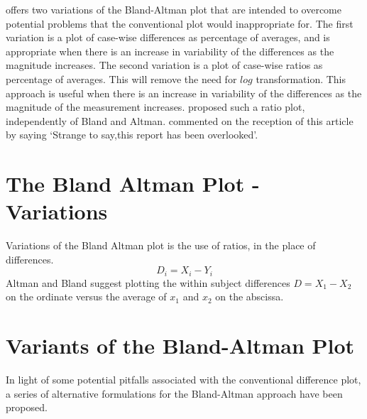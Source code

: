 \documentclass[12pt, a4paper]{report}
\theoremstyle{plain}
\theoremstyle{definition}
\theoremstyle{remark}
\begin{document}
	\citet{BA99} offers two variations of the Bland-Altman plot that
	are intended to overcome potential problems that the conventional
	plot would inappropriate for. The first variation is a plot of
	case-wise differences as percentage of averages, and is
	appropriate when there is an increase in variability of the
	differences as the magnitude increases. The second variation is a
	plot of case-wise ratios as percentage of averages. This will
	remove the need for $log$ transformation. This approach is useful
	when there is an increase in variability of the differences as the
	magnitude of the measurement increases. \citet{Eksborg} proposed
	such a ratio plot, independently of Bland and Altman.
	\citet{Dewitte} commented on the reception of this article by
	saying `Strange to say,this report has been overlooked'.

	
	
	
	
	

	\section{The Bland Altman Plot - Variations}
	Variations of the Bland Altman plot is the use of ratios, in the
	place of differences.
	\begin{equation}
		D_{i} = X_{i} - Y_{i}   \label{BA01}
	\end{equation}
	Altman and Bland suggest plotting the within subject differences $
	D = X_{1} - X_{2} $ on the ordinate versus the average of $x_{1}$
	and  $x_{2}$ on the abscissa.
		\section{Variants of the Bland-Altman Plot}
		In light of some potential pitfalls associated with the conventional difference plot, a series of alternative formulations for the Bland-Altman approach have been proposed.
		
\end{document}
